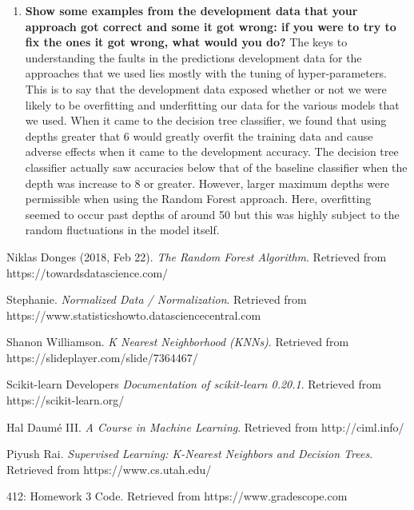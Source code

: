 \documentclass[5px]{report}
\begin{document}
\begin{enumerate}
\item \textbf{Show some examples from the development data that your approach got correct and some it got wrong: if you were to try to fix the ones it got wrong, what would you do?}
The keys to understanding the faults in the predictions development data for the approaches that we used lies mostly with the tuning of hyper-parameters.  This is to say that the development data exposed whether or not we were likely to be overfitting and underfitting our data for the various models that we used.  When it came to the decision tree classifier, we found that using depths greater that 6 would greatly overfit the training data and cause adverse effects when it came to the development accuracy.   The decision tree classifier actually saw accuracies below that of the baseline classifier when the depth was increase to 8 or greater.  However, larger maximum depths were permissible when using the Random Forest approach.  Here, overfitting seemed to occur past depths of around 50 but this was highly subject to the random fluctuations in the model itself.
\end{enumerate}

\begin{thebibliography}{9}


Niklas Donges (2018, Feb 22).
\textit{The Random Forest Algorithm}. 
Retrieved from https://towardsdatascience.com/
 
Stephanie.
\textit{Normalized Data / Normalization}. 
Retrieved from https://www.statisticshowto.datasciencecentral.com


Shanon Williamson.
\textit{K Nearest Neighborhood (KNNs)}. 
Retrieved from https://slideplayer.com/slide/7364467/

Scikit-learn Developers
\textit{Documentation of scikit-learn 0.20.1}. 
Retrieved from https://scikit-learn.org/

Hal Daumé III.
\textit{A Course in Machine Learning}. 
Retrieved from http://ciml.info/

Piyush Rai.
\textit{Supervised Learning:
K-Nearest Neighbors and Decision Trees}. 
Retrieved from https://www.cs.utah.edu/

412: Homework 3 Code.
Retrieved from https://www.gradescope.com




\end{thebibliography}
\end{document}
